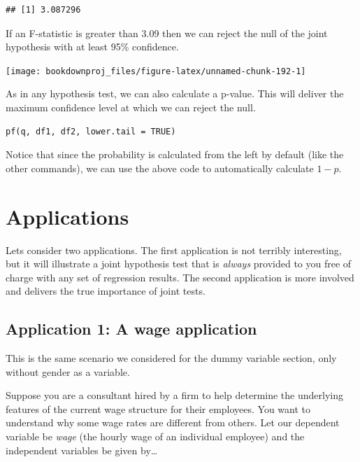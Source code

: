 \documentclass[
]{book}
\begin{document}
\begin{verbatim}
## [1] 3.087296
\end{verbatim}

If an F-statistic is greater than 3.09 then we can reject the null of the joint hypothesis with at least 95\% confidence.

\begin{center}\texttt{[image: bookdownproj\_files/figure-latex/unnamed-chunk-192-1]} \end{center}

As in any hypothesis test, we can also calculate a p-value. This will deliver the maximum confidence level at which we can reject the null.

\begin{verbatim}
pf(q, df1, df2, lower.tail = TRUE)
\end{verbatim}

Notice that since the probability is calculated from the left by default (like the other commands), we can use the above code to automatically calculate \(1-p\).

\hypertarget{applications}{%
\section{Applications}\label{applications}}

Lets consider two applications. The first application is not terribly interesting, but it will illustrate a joint hypothesis test that is \emph{always} provided to you free of charge with any set of regression results. The second application is more involved and delivers the true importance of joint tests.

\hypertarget{application-1-a-wage-application}{%
\subsection*{Application 1: A wage application}\label{application-1-a-wage-application}}

This is the same scenario we considered for the dummy variable section, only without gender as a variable.

Suppose you are a consultant hired by a firm to help determine the underlying features of the current wage structure for their employees. You want to understand why some wage rates are different from others. Let our dependent variable be \emph{wage} (the hourly wage of an individual employee) and the independent variables be given by\ldots{}
\end{document}
